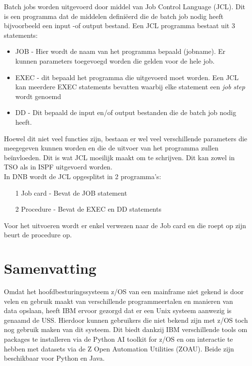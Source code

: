 Batch jobs worden uitgevoerd door middel van Job Control Language (JCL). Dit is een programma dat de middelen definiëerd die de batch job nodig heeft bijvoorbeeld een input -of output bestand. Een JCL programma bestaat uit 3 statements: 
\begin{itemize}
    \item JOB - Hier wordt de naam van het programma bepaald (jobname). Er kunnen parameters toegevoegd worden die gelden voor de hele job.
    \item EXEC - dit bepaald het programma die uitgevoerd moet worden. Een JCL kan meerdere EXEC statements bevatten waarbij elke statement een \textit{job step} wordt genoemd
    \item DD - Dit bepaald de input en/of output bestanden die de batch job nodig heeft.
\end{itemize}
Hoewel dit niet veel functies zijn, bestaan er wel veel verschillende parameters die meegegeven kunnen worden en die de uitvoer van het programma zullen beïnvloeden. Dit is wat JCL moeilijk maakt om te schrijven. Dit kan zowel in TSO als in ISPF uitgevoerd worden. \autocite{IBM} \\

In DNB wordt de JCL opgesplitst in 2 programma's:

\begin{itemize}
    \item[1] Job card - Bevat de JOB statement
    \item[2] Procedure - Bevat de EXEC en DD statements
\end{itemize}
Voor het uitvoeren wordt er enkel verwezen naar de Job card en die roept op zijn beurt de procedure op. \\

\newpage
\section{Samenvatting}
Omdat het hoofdbesturingssysteem z/OS van een mainframe niet gekend is door velen en gebruik maakt van verschillende programmeertalen en manieren van data opslaan, heeft IBM ervoor gezorgd dat er een Unix systeem aanwezig is genaamd de USS. Hierdoor kunnen gebruikers die niet bekend zijn met z/OS toch nog gebruik maken van dit systeem. Dit biedt dankzij IBM verschillende tools om packages te installeren via de Python AI toolkit for z/OS en om interactie te hebben met datasets via de Z Open Automation Utilities (ZOAU). Beide zijn beschikbaar voor Python en Java. \\

